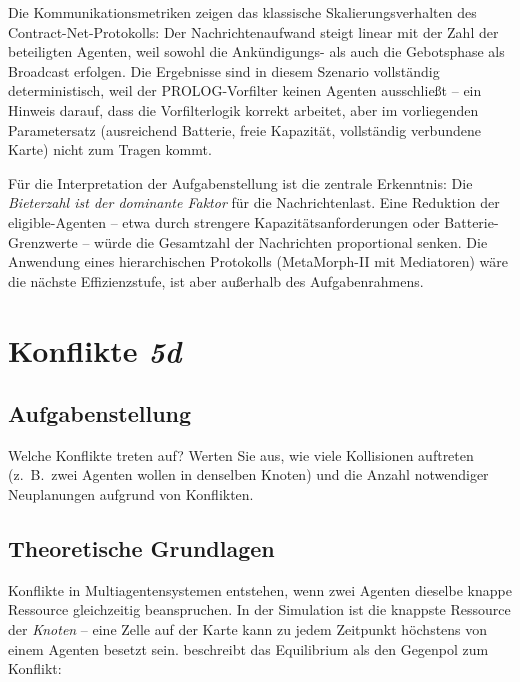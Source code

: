 Die Kommunikationsmetriken zeigen das klassische Skalierungsverhalten des Contract-Net-Protokolls: Der Nachrichtenaufwand steigt linear mit der Zahl der beteiligten Agenten, weil sowohl die Ankündigungs- als auch die Gebotsphase als Broadcast erfolgen. Die Ergebnisse sind in diesem Szenario vollständig deterministisch, weil der \acs{PROLOG}-Vorfilter keinen Agenten ausschließt -- ein Hinweis darauf, dass die Vorfilterlogik korrekt arbeitet, aber im vorliegenden Parametersatz (ausreichend Batterie, freie Kapazität, vollständig verbundene Karte) nicht zum Tragen kommt.

Für die Interpretation der Aufgabenstellung ist die zentrale Erkenntnis: Die \textit{Bieterzahl ist der dominante Faktor} für die Nachrichtenlast. Eine Reduktion der eligible-Agenten -- etwa durch strengere Kapazitätsanforderungen oder Batterie-Grenzwerte -- würde die Gesamtzahl der Nachrichten proportional senken. Die Anwendung eines hierarchischen Protokolls (MetaMorph-II mit Mediatoren) wäre die nächste Effizienzstufe, ist aber außerhalb des Aufgabenrahmens.


\section{Konflikte \textit{5d}}
\label{sec:aufgabe5d}

\subsection{Aufgabenstellung}

Welche Konflikte treten auf? Werten Sie aus, wie viele Kollisionen auftreten (z.~B.\ zwei Agenten wollen in denselben Knoten) und die Anzahl notwendiger Neuplanungen aufgrund von Konflikten.

\subsection{Theoretische Grundlagen}

Konflikte in Multiagentensystemen entstehen, wenn zwei Agenten dieselbe knappe Ressource gleichzeitig beanspruchen. In der Simulation ist die knappste Ressource der \textit{Knoten} -- eine Zelle auf der Karte kann zu jedem Zeitpunkt höchstens von einem Agenten besetzt sein. \textcite[S. 43]{5} beschreibt das Equilibrium als den Gegenpol zum Konflikt:


